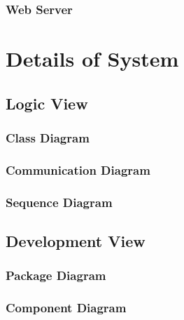 \documentclass[12pt]{article}
\begin{document}
	\subsubsection{Web Server}



\section{Details of System}

	\subsection {Logic View}
	
	

	\subsubsection{Class Diagram}



	\subsubsection{Communication Diagram}



	\subsubsection {Sequence Diagram}



	\subsection{Development View}



	\subsubsection{Package Diagram}



	\subsubsection{Component Diagram}
\end{document}
